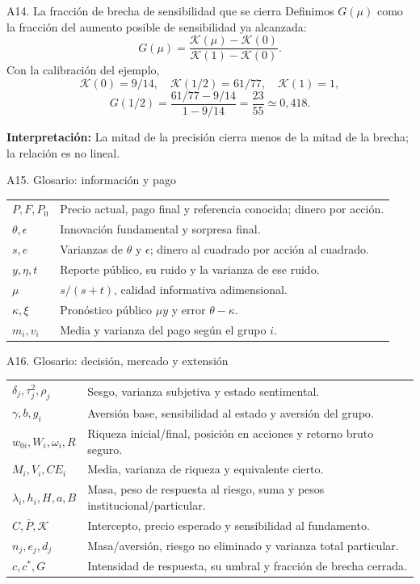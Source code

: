\documentclass[aspectratio=169,11pt]{beamer}
\newcommand{\K}{\mathcal K}
\newcommand{\idea}[1]{\par\medskip\textbf{Interpretación:} #1}
\begin{document}
\begin{frame}{A14. La fracción de brecha de sensibilidad que se cierra}
Definimos \(G(\mu)\) como la fracción del aumento posible de sensibilidad
ya alcanzada:
\[
G(\mu)=\frac{\K(\mu)-\K(0)}{\K(1)-\K(0)}.
\]
Con la calibración del ejemplo,
\[
\K(0)=9/14,\quad \K(1/2)=61/77,\quad \K(1)=1,
\]
\[
G(1/2)=\frac{61/77-9/14}{1-9/14}=\frac{23}{55}\simeq0{,}418.
\]
\idea{La mitad de la precisión cierra menos de la mitad de la brecha;
la relación es no lineal.}
\end{frame}

\begin{frame}{A15. Glosario: información y pago}
\small
\begin{tabular}{lp{9.2cm}}
\toprule
\(P,F,P_0\) & Precio actual, pago final y referencia conocida; dinero por acción.\\
\(\theta,\epsilon\) & Innovación fundamental y sorpresa final.\\
\(s,e\) & Varianzas de \(\theta\) y \(\epsilon\); dinero al cuadrado por acción al cuadrado.\\
\(y,\eta,t\) & Reporte público, su ruido y la varianza de ese ruido.\\
\(\mu\) & \(s/(s+t)\), calidad informativa adimensional.\\
\(\kappa,\xi\) & Pronóstico público \(\mu y\) y error \(\theta-\kappa\).\\
\(m_i,v_i\) & Media y varianza del pago según el grupo \(i\).\\
\bottomrule
\end{tabular}
\end{frame}

\begin{frame}{A16. Glosario: decisión, mercado y extensión}
\small
\begin{tabular}{lp{9.2cm}}
\toprule
\(\delta_j,\tau_j^2,\rho_j\) & Sesgo, varianza subjetiva y estado sentimental.\\
\(\gamma,b,g_i\) & Aversión base, sensibilidad al estado y aversión del grupo.\\
\(w_{0i},W_i,\omega_i,R\) & Riqueza inicial/final, posición en acciones y retorno bruto seguro.\\
\(M_i,V_i,CE_i\) & Media, varianza de riqueza y equivalente cierto.\\
\(\lambda_i,h_i,H,a,B\) & Masa, peso de respuesta al riesgo, suma y pesos institucional/particular.\\
\(C,\bar P,\K\) & Intercepto, precio esperado y sensibilidad al fundamento.\\
\(n_j,e_j,d_j\) & Masa/aversión, riesgo no eliminado y varianza total particular.\\
\(c,c^*,G\) & Intensidad de respuesta, su umbral y fracción de brecha cerrada.\\
\bottomrule
\end{tabular}
\end{frame}
\end{document}
